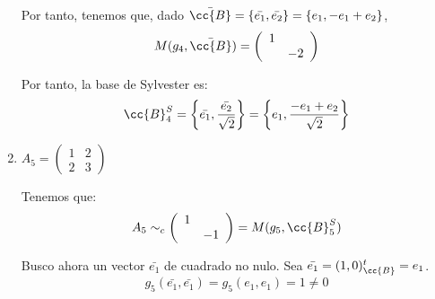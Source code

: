\begin{ejercicio}
\begin{enumerate}
        Por tanto, tenemos que, dado $\bar{\cc{B}} = \{\bar{e_1},\bar{e_2}\} = \{e_1, -e_1+e_2\}$,
        \begin{equation*}
            M(g_4, \bar{\cc{B}}) = \left(\begin{array}{cc}
            1 &  \\
             & -2
        \end{array} \right)
        \end{equation*}

        Por tanto, la base de Sylvester es:
        \begin{equation*}
            \cc{B}_4^S = \left\{\bar{e_1},\frac{\bar{e_2}}{\sqrt{2}}\right\} = \left\{e_1, \frac{-e_1+e_2}{\sqrt{2}}\right\}
        \end{equation*}

        \item $A_5=\left(\begin{array}{cc}
            1 & 2 \\
            2 & 3
        \end{array} \right)$
        
        Tenemos que:
        \begin{equation*}
            A_5 \sim_c \left(\begin{array}{cc}
                1 &  \\
                & -1
            \end{array} \right) = M(g_5, \cc{B}_{5}^S)
        \end{equation*}
        
        Busco ahora un vector $\bar{e_1}$ de cuadrado no nulo. Sea $\bar{e_1} = (1,0)^t_{\cc{B}} = e_1$.
        \begin{equation*}
            g_5(\bar{e_1}, \bar{e_1}) =
            g_5(e_1, e_1) = 1 \neq 0
        \end{equation*}


\end{enumerate}
\end{ejercicio}

